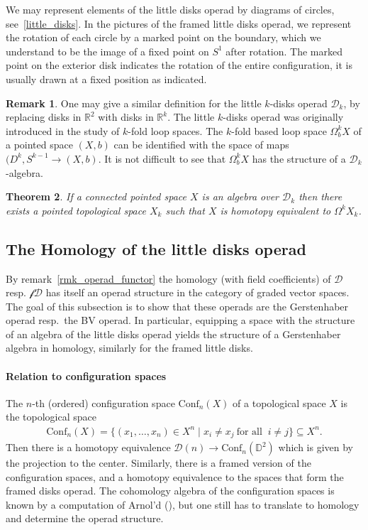 \documentclass{scrartcl}
\theoremstyle{plain}
\newtheorem{theorem}{Theorem}[section]
\theoremstyle{definition}
\newtheorem{remark}[theorem]{Remark}
\newcommand{\R}{\mathbb{R}}
\renewcommand{\subset}{\subseteq}
\begin{document}
We may represent elements of the little disks operad by diagrams of circles, see~\ref{little_disks}. In the pictures of the framed little disks operad, we represent the rotation of each circle by a marked point on the boundary, which we understand to be the image of a fixed point on $S^1$ after rotation. The marked point on the exterior disk indicates the rotation of the entire configuration, it is usually drawn at a fixed position as indicated. 

\begin{remark}
One may give a similar definition for the little $k$-disks operad $\mathcal D_k$, by replacing disks in $\R^2$ with disks in $\R^k$. The little $k$-disks operad was originally introduced in the study of $k$-fold loop spaces. The $k$-fold based loop space $\Omega^k_b X$ of a pointed space $(X,b)$ can be identified with the space of maps $\mathds (D^k, S^{k-1} \to (X, b)$. It is not difficult to see that $\Omega^k_b X$ has the structure of a $\mathcal D_k$-algebra. 
\end{remark}
\begin{theorem}
    If a connected pointed space $X$ is an algebra over $\mathcal D_k$ then there exists a pointed topological space $X_k$ such that $X$ is homotopy equivalent to $\Omega^k X_k$.
\end{theorem}


\subsection*{The Homology of the little disks operad}
By remark~\ref{rmk_operad_functor} the homology (with field coefficients) of $\mathcal D$ resp. $\mathcal {fD}$ has itself an operad structure in the category of graded vector spaces. The goal of this subsection is to show that these operads are the Gerstenhaber operad resp.\ the BV operad. In particular, equipping a space with the structure of an algebra of the little disks operad yields the structure of a Gerstenhaber algebra in homology, similarly for the framed little disks. 

\paragraph{Relation to configuration spaces} The $n$-th (ordered) configuration space $\mathrm{Conf}_n(X)$ of a topological space $X$ is the topological space 
\begin{align*}
    \mathrm{Conf}_n(X) = \{(x_1, \dots, x_n) \in X^n \mid x_i \neq x_j \ \text{for all }\ i\neq j\} \subset X^n.
\end{align*} 
Then there is a homotopy equivalence $\mathcal D(n) \to \mathrm{Conf}_n(\mathds{D}^2)$ which is given by the projection to the center. Similarly, there is a framed version of the configuration spaces, and a homotopy equivalence to the spaces that form the framed disks operad. The cohomology algebra of the configuration spaces is known by a computation of Arnol'd (\cite{arnold2014cohomology}), but one still has to translate to homology and determine the operad structure. 
\end{document}
